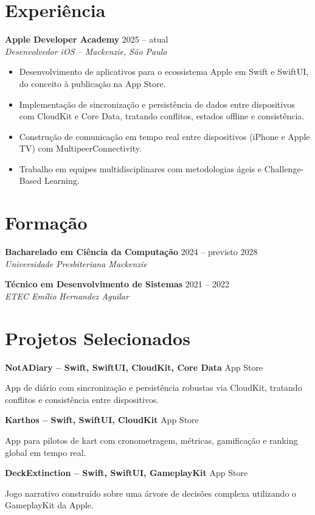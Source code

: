 \documentclass[11pt,a4paper]{article}
\newcommand{\entry}[3]{%
  \textbf{#1} \hfill {\color{muted}#3}\\[1pt]
  {\color{muted}\itshape #2}\par\vspace{2pt}}
\newcommand{\entrysimple}[2]{%
  \textbf{#1} \hfill {\color{muted}#2}\par\vspace{2pt}}
\newenvironment{points}
  {\begin{itemize}[leftmargin=1.2em,itemsep=1pt,topsep=2pt,parsep=0pt]}
  {\end{itemize}}
\begin{document}
\section{Experiência}
\entry{Apple Developer Academy}{Desenvolvedor iOS -- Mackenzie, São Paulo}{2025 -- atual}
\begin{points}
  \item Desenvolvimento de aplicativos para o ecossistema Apple em Swift e SwiftUI, do conceito à publicação na App Store.
  \item Implementação de sincronização e persistência de dados entre dispositivos com CloudKit e Core Data, tratando conflitos, estados offline e consistência.
  \item Construção de comunicação em tempo real entre dispositivos (iPhone e Apple TV) com MultipeerConnectivity.
  \item Trabalho em equipes multidisciplinares com metodologias ágeis e Challenge-Based Learning.
\end{points}

\section{Formação}
\entry{Bacharelado em Ciência da Computação}{Universidade Presbiteriana Mackenzie}{2024 -- previsto 2028}
\vspace{2pt}
\entry{Técnico em Desenvolvimento de Sistemas}{ETEC Emílio Hernandez Aguilar}{2021 -- 2022}

\section{Projetos Selecionados}
\entrysimple{NotADiary \textnormal{\color{muted}-- Swift, SwiftUI, CloudKit, Core Data}}{App Store}
App de diário com sincronização e persistência robustas via CloudKit, tratando conflitos e consistência entre dispositivos.
\vspace{2pt}

\entrysimple{Karthos \textnormal{\color{muted}-- Swift, SwiftUI, CloudKit}}{App Store}
App para pilotos de kart com cronometragem, métricas, gamificação e ranking global em tempo real.
\vspace{2pt}

\entrysimple{DeckExtinction \textnormal{\color{muted}-- Swift, SwiftUI, GameplayKit}}{App Store}
Jogo narrativo construído sobre uma árvore de decisões complexa utilizando o GameplayKit da Apple.
\vspace{2pt}
\end{document}
